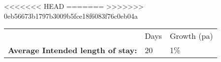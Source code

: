 <<<<<<< HEAD
=======
>>>>>>> 0eb56673b1797b3009b5fce18f6083f76c0eb04a
\begin{tabular}[t]{p{5cm}p{1.3cm}p{1.2cm}}
   & Days & Growth (pa) \\ 
 \textbf{Average Intended length of stay:} & 20 & 1\% \\ 
  \end{tabular}
